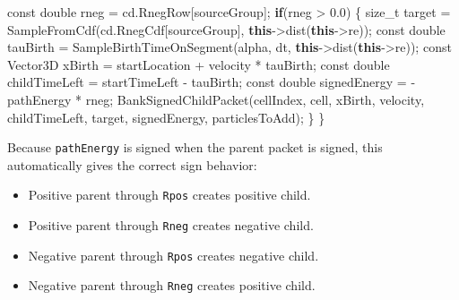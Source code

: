 \documentclass[
]{article}
\newenvironment{Shaded}{}{}
\newcommand{\AttributeTok}[1]{\textcolor[rgb]{0.49,0.56,0.16}{#1}}
\newcommand{\ControlFlowTok}[1]{\textcolor[rgb]{0.00,0.44,0.13}{\textbf{#1}}}
\newcommand{\DataTypeTok}[1]{\textcolor[rgb]{0.56,0.13,0.00}{#1}}
\newcommand{\FloatTok}[1]{\textcolor[rgb]{0.25,0.63,0.44}{#1}}
\newcommand{\KeywordTok}[1]{\textcolor[rgb]{0.00,0.44,0.13}{\textbf{#1}}}
\newcommand{\NormalTok}[1]{#1}
\newcommand{\OperatorTok}[1]{\textcolor[rgb]{0.40,0.40,0.40}{#1}}
\providecommand{\tightlist}{%
  \setlength{\itemsep}{0pt}\setlength{\parskip}{0pt}}
\begin{document}
\begin{Shaded}
\begin{Highlighting}[]
    \AttributeTok{const} \DataTypeTok{double}\NormalTok{ rneg }\OperatorTok{=}\NormalTok{ cd}\OperatorTok{.}\NormalTok{RnegRow}\OperatorTok{[}\NormalTok{sourceGroup}\OperatorTok{];}
    \ControlFlowTok{if}\OperatorTok{(}\NormalTok{rneg }\OperatorTok{\textgreater{}} \FloatTok{0.0}\OperatorTok{)}
    \OperatorTok{\{}
        \DataTypeTok{size\_t}\NormalTok{ target }\OperatorTok{=}\NormalTok{ SampleFromCdf}\OperatorTok{(}\NormalTok{cd}\OperatorTok{.}\NormalTok{RnegCdf}\OperatorTok{[}\NormalTok{sourceGroup}\OperatorTok{],} \KeywordTok{this}\OperatorTok{{-}\textgreater{}}\NormalTok{dist}\OperatorTok{(}\KeywordTok{this}\OperatorTok{{-}\textgreater{}}\NormalTok{re}\OperatorTok{));}
        \AttributeTok{const} \DataTypeTok{double}\NormalTok{ tauBirth }\OperatorTok{=}\NormalTok{ SampleBirthTimeOnSegment}\OperatorTok{(}\NormalTok{alpha}\OperatorTok{,}\NormalTok{ dt}\OperatorTok{,} \KeywordTok{this}\OperatorTok{{-}\textgreater{}}\NormalTok{dist}\OperatorTok{(}\KeywordTok{this}\OperatorTok{{-}\textgreater{}}\NormalTok{re}\OperatorTok{));}
        \AttributeTok{const}\NormalTok{ Vector3D xBirth }\OperatorTok{=}\NormalTok{ startLocation }\OperatorTok{+}\NormalTok{ velocity }\OperatorTok{*}\NormalTok{ tauBirth}\OperatorTok{;}
        \AttributeTok{const} \DataTypeTok{double}\NormalTok{ childTimeLeft }\OperatorTok{=}\NormalTok{ startTimeLeft }\OperatorTok{{-}}\NormalTok{ tauBirth}\OperatorTok{;}
        \AttributeTok{const} \DataTypeTok{double}\NormalTok{ signedEnergy }\OperatorTok{=} \OperatorTok{{-}}\NormalTok{pathEnergy }\OperatorTok{*}\NormalTok{ rneg}\OperatorTok{;}
\NormalTok{        BankSignedChildPacket}\OperatorTok{(}\NormalTok{cellIndex}\OperatorTok{,}\NormalTok{ cell}\OperatorTok{,}\NormalTok{ xBirth}\OperatorTok{,}\NormalTok{ velocity}\OperatorTok{,}\NormalTok{ childTimeLeft}\OperatorTok{,}\NormalTok{ target}\OperatorTok{,}\NormalTok{ signedEnergy}\OperatorTok{,}\NormalTok{ particlesToAdd}\OperatorTok{);}
    \OperatorTok{\}}
\OperatorTok{\}}
\end{Highlighting}
\end{Shaded}

Because \texttt{pathEnergy} is signed when the parent packet is signed,
this automatically gives the correct sign behavior:

\begin{itemize}
\tightlist
\item
  Positive parent through \texttt{Rpos} creates positive child.
\item
  Positive parent through \texttt{Rneg} creates negative child.
\item
  Negative parent through \texttt{Rpos} creates negative child.
\item
  Negative parent through \texttt{Rneg} creates positive child.
\end{itemize}
\end{document}

